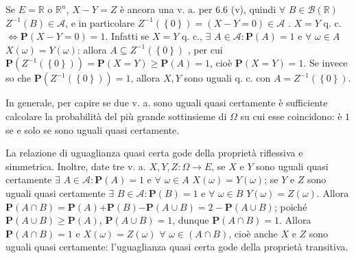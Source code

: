\documentclass{article}
\begin{document}
Se $E=%
\mathbb{R}
$ o $%
\mathbb{R}
^{n}$, $X-Y=Z$ \`{e} ancora una v. a. per 6.6 (v), quindi $\forall $ $B\in 
\mathcal{B}\left( 
\mathbb{R}
\right) $ $Z^{-1}\left( B\right) \in \mathcal{A}$, e in particolare $%
Z^{-1}\left( \left\{ 0\right\} \right) =\left( X-Y=0\right) \in \mathcal{A}$%
. $X=Y$ q. c. $\Longleftrightarrow \mathbf{P}\left( X-Y=0\right) =1$.
Infatti se $X=Y$ q. c., $\exists $ $A\in \mathcal{A}:\mathbf{P}\left(
A\right) =1$ e $\forall $ $\omega \in A$ $X\left( \omega \right) =Y\left(
\omega \right) $: allora $A\subseteq Z^{-1}\left( \left\{ 0\right\} \right) $%
, per cui $\mathbf{P}\left( Z^{-1}\left( \left\{ 0\right\} \right) \right) =%
\mathbf{P}\left( X=Y\right) \geq \mathbf{P}\left( A\right) =1$, cio\`{e} $%
\mathbf{P}\left( X=Y\right) =1$. Se invece so che $\mathbf{P}\left(
Z^{-1}\left( \left\{ 0\right\} \right) \right) =1$, allora $X,Y$ sono uguali
q. c. con $A=Z^{-1}\left( \left\{ 0\right\} \right) $.

In generale, per capire se due v. a. sono uguali quasi certamente \`{e}
sufficiente calcolare la probabilit\`{a} del pi\`{u} grande sottinsieme di $%
\Omega $ su cui esse coincidono: \`{e} $1$ se e solo se sono uguali quasi
certamente.

La relazione di uguaglianza quasi certa gode della propriet\`{a} riflessiva
e simmetrica. Inoltre, date tre v. a. $X,Y,Z:\Omega \rightarrow E$, se $X$ e 
$Y$ sono uguali quasi certamente $\exists $ $A\in \mathcal{A}:\mathbf{P}%
\left( A\right) =1$ e $\forall $ $\omega \in A$ $X\left( \omega \right)
=Y\left( \omega \right) $; se $Y$ e $Z$ sono uguali quasi certamente $%
\exists $ $B\in \mathcal{A}:\mathbf{P}\left( B\right) =1$ e $\forall $ $%
\omega \in B$ $Y\left( \omega \right) =Z\left( \omega \right) $. Allora $%
\mathbf{P}\left( A\cap B\right) =\mathbf{P}\left( A\right) \mathbf{+P}\left(
B\right) \mathbf{-P}\left( A\cup B\right) =2-\mathbf{P}\left( A\cup B\right) 
$; poich\'{e} $\mathbf{P}\left( A\cup B\right) \geq \mathbf{P}\left(
A\right) $, $\mathbf{P}\left( A\cup B\right) =1$, dunque $\mathbf{P}\left(
A\cap B\right) =1$. Allora $\mathbf{P}\left( A\cap B\right) =1$ e $X\left(
\omega \right) =Z\left( \omega \right) $ $\forall $ $\omega \in \left( A\cap
B\right) $, cio\`{e} anche $X$ e $Z$ sono uguali quasi certamente:
l'uguaglianza quasi certa gode della propriet\`{a} transitiva.
\end{document}
